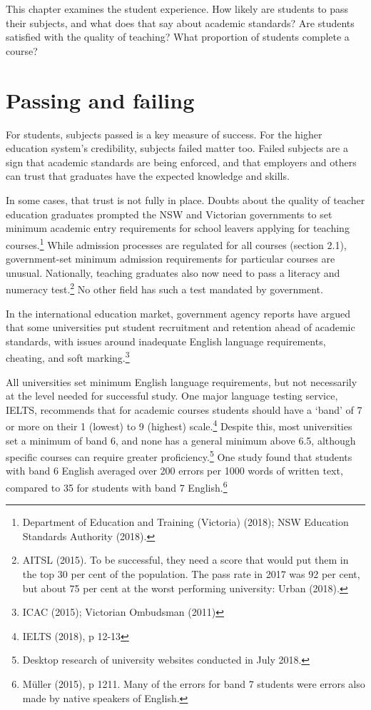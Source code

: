\documentclass[]{book}
\begin{document}
\hypertarget{section-4}{%
\section{}\label{section-4}}

This chapter examines the student experience. How likely are students to pass their subjects, and what does that say about academic standards? Are students satisfied with the quality of teaching? What proportion of students complete a course?

\hypertarget{passing-and-failing}{%
\section{Passing and failing }\label{passing-and-failing}}

For students, subjects passed is a key measure of success. For the higher education system's credibility, subjects failed matter too. Failed subjects are a sign that academic standards are being enforced, and that employers and others can trust that graduates have the expected knowledge and skills.

In some cases, that trust is not fully in place. Doubts about the quality of teacher education graduates prompted the NSW and Victorian governments to set minimum academic entry requirements for school leavers applying for teaching courses.\footnote{Department of Education and Training (Victoria) (2018); NSW Education Standards Authority (2018).} While admission processes are regulated for all courses (section 2.1), government-set minimum admission requirements for particular courses are unusual. Nationally, teaching graduates also now need to pass a literacy and numeracy test.\footnote{AITSL (2015). To be successful, they need a score that would put them in the top 30 per cent of the population. The pass rate in 2017 was 92 per cent, but about 75 per cent at the worst performing university: Urban (2018).} No other field has such a test mandated by government.

In the international education market, government agency reports have argued that some universities put student recruitment and retention ahead of academic standards, with issues around inadequate English language requirements, cheating, and soft marking.\footnote{ICAC (2015); Victorian Ombudsman (2011)}

All universities set minimum English language requirements, but not necessarily at the level needed for successful study. One major language testing service, IELTS, recommends that for academic courses students should have a `band' of 7 or more on their 1 (lowest) to 9 (highest) scale.\footnote{IELTS (2018), p 12-13} Despite this, most universities set a minimum of band 6, and none has a general minimum above 6.5, although specific courses can require greater proficiency.\footnote{Desktop research of university websites conducted in July 2018.} One study found that students with band 6 English averaged over 200 errors per 1000 words of written text, compared to 35 for students with band 7 English.\footnote{Müller (2015), p 1211. Many of the errors for band 7 students were errors also made by native speakers of English.}
\end{document}
